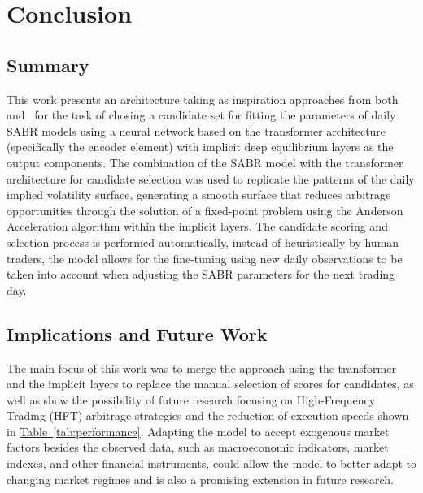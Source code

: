\section{Conclusion}
\label{sec:conclusion}

\subsection{Summary}
\label{subsec:summary}
This work presents an architecture taking as inspiration approaches from both~\citet{Kim2021} and~\citet{Kolter2020}
for the task of chosing a candidate set for fitting the parameters of daily SABR models using a neural network based on the transformer architecture
(specifically the encoder element) with implicit deep equilibrium layers as the output components.
The combination of the SABR model with the transformer architecture for candidate selection was used to replicate the patterns of the daily implied volatility surface,
generating a smooth surface that reduces arbitrage opportunities through the solution of a fixed-point problem using the Anderson Acceleration algorithm within the implicit layers.
The candidate scoring and selection process is performed automatically, instead of heuristically by human traders,
the model allows for the fine-tuning using new daily observations to be taken into account when adjusting the SABR parameters for the next trading day.

\subsection{Implications and Future Work}
\label{subsec:implications}
The main focus of this work was to merge the approach using the transformer and the implicit layers to replace the manual selection of scores for candidates,
as well as show the possibility of future research focusing on High-Frequency Trading (HFT)
arbitrage strategies and the reduction of execution speeds shown in \hyperref[tab:performance]{Table~\ref*{tab:performance}}.
Adapting the model to accept exogenous market factors besides the observed data, such as macroeconomic indicators, market indexes, and other financial instruments,
could allow the model to better adapt to changing market regimes and is also a promising extension in future research.
